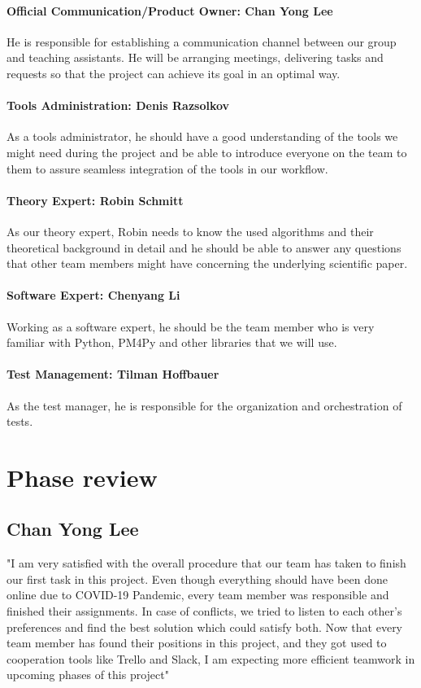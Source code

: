 \documentclass{article}
\begin{document}
\paragraph{Official Communication/Product Owner: Chan Yong Lee}
He is responsible for establishing a communication channel between our group and teaching assistants. He will be arranging meetings, delivering tasks and requests so that the project can achieve its goal in an optimal way.

\paragraph{Tools Administration: Denis Razsolkov} As a tools administrator, he should have a good understanding of the tools we might need during the project and be able to introduce everyone on the team to them to assure seamless integration of the tools in our workflow.

\paragraph{Theory Expert: Robin Schmitt} As our theory expert, Robin needs to know the used algorithms and their theoretical background in detail and he should be able to answer any questions that other team members might have concerning the underlying scientific paper.

\paragraph{Software Expert: Chenyang Li}
Working as a software expert, he should be the team member who is very familiar with Python, PM4Py and other libraries that we will use.

\paragraph{Test Management: Tilman Hoffbauer}
As the test manager, he is responsible for the organization and orchestration of tests.

\section{Phase review}

\subsection{Chan Yong Lee}
"I am very satisfied with the overall procedure that our team has taken to finish our first task in this project. Even though everything should have been done online due to COVID-19 Pandemic, every team member was responsible and finished their assignments. In case of conflicts, we tried to listen to each other's preferences and find the best solution which could satisfy both. Now that every team member has found their positions in this project, and they got used to cooperation tools like Trello and Slack, I am expecting more efficient teamwork in upcoming phases of this project"
\end{document}
